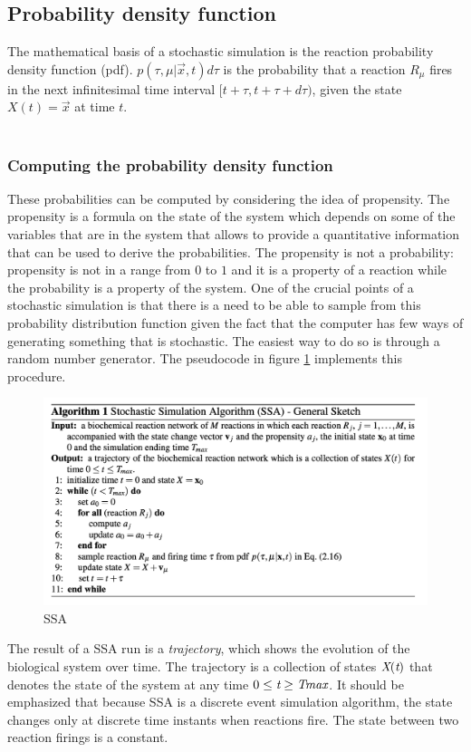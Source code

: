   \subsection{Probability density function}
  The mathematical basis of a stochastic simulation is the reaction probability density function (pdf).
  $p(\tau, \mu |\vec{x}, t)d\tau$ is the probability that a reaction $R_\mu$ fires in the next infinitesimal time interval $[t+\tau,t+\tau+d\tau)$, given the state $X(t) = \vec{x}$ at time $t$.
  \\
  \\
  \noindent

    \subsubsection{Computing the probability density function}
    These probabilities can be computed by considering the idea of propensity.
    The propensity is a formula on the state of the system which depends on some of the variables that are in the system that allows to provide a quantitative information that can be used to derive the probabilities.
    The propensity is not a probability: propensity is not in a range from $0$ to $1$ and it is a property of a reaction while the probability is a property of the system.
    One of the crucial points of a stochastic simulation is that there is a need to be able to sample from this probability distribution  function given the fact that the computer has few ways of generating something that is stochastic.
    The easiest way to do so is through a random number generator.
    The pseudocode in figure \ref{fig:SSA} implements this procedure.

    \begin{figure}
      \centering
      \includegraphics[width=\textwidth]{SSA_algo.png}
      \caption{SSA}
      \label{fig:SSA}
    \end{figure}

    The result of a SSA run is a \emph{trajectory}, which shows the evolution of the biological system over time.
    The trajectory is a collection of states $\emph{X}(\emph{t})$ that denotes the state of the system at any time $0 \leq \emph{t}\geq \emph{Tmax}$.
    It should be emphasized that because SSA is a discrete event simulation algorithm, the state changes only at discrete time instants when reactions fire.
    The state between two reaction firings is a constant.
